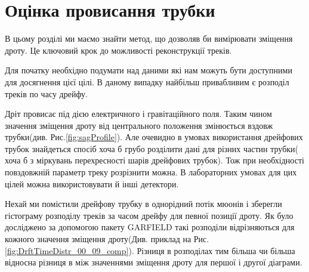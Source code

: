 	
	\section{ Оцінка провисання трубки}

	В цьому розділі ми маємо знайти метод, що дозволяв би вимірювати зміщення дроту. Це ключовий крок до можливості реконструкції треків.

	Для	початку необхідно подумати над даними які нам можуть бути доступними для досягнення цієї цілі. В даному випадку найбільш привабливим є розподіл треків по часу дрейфу.

	Дріт провисає під дією електричного і гравітаційного поля. Таким чином значення зміщення дроту  від центрального положення змінюється вздовж трубки(див. Рис.\ref{fig:sagProfile}). Але очевидно в умовах використання дрейфових трубок знайдеться спосіб хоча б грубо розділити дані для різних частин трубки( хоча б з міркувань перехресності шарів дрейфових трубок). Тож при необхідності повздовжній параметр треку розрізнити можна. В лабораторних умовах для цих цілей можна використовувати й інші детектори.
	

	Нехай ми помістили дрейфову трубку в однорідний потік  мюонів і зберегли гістограму розподілу треків за часом дрейфу для певної позиції дроту. Як було досліджено за допомогою пакету GARFIELD такі розподіли відрізняються для кожного значення зміщення дроту(Див. приклад на Рис.\ref{fig:DrftTimeDistr_00_09_comp}). Різниця в розподілах тим більша чи більша відносна різниця в між значеннями зміщення дроту для першої і другої діаграми.
		
